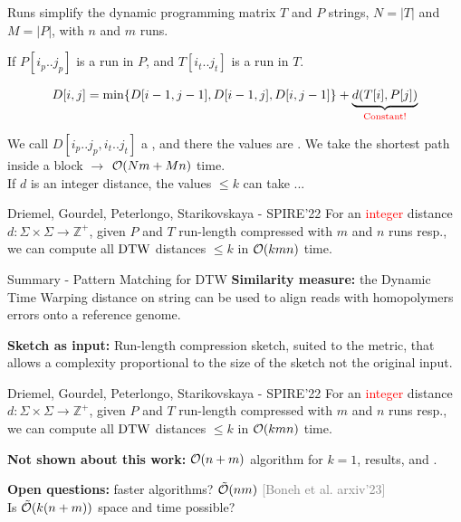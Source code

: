 \begin{frame}{Runs simplify the dynamic programming matrix}
    $T$ and $P$ strings, $N=|T|$ and $M=|P|$, with $n$ and $m$ runs. \pause
    \smallskip

    If $P[i_p.. j_p]$ is a run in $P$, and $T[i_t .. j_t]$ is a run in $T$.\pause
    
    
    {
    \[
        D[i,j] = {\min\{D[i-1,j-1],D[i-1,j],D[i,j-1]\}
        + \underbrace{d(T[i], P[j])}_\text{\textcolor{red}{Constant!}}}
    \]
    }

    \pause       
    We call $D[i_p .. j_p, i_t .. j_t]$ a , and there the values are . \pause
    We take the shortest path inside a block $\rightarrow$ $\mathcal{O}(Nm+Mn)$ time.\\ \pause
    If $d$ is an integer distance, the values $\leq k$ can take ... \pause
    
    \begin{myalertblock}{Driemel, Gourdel, Peterlongo, Starikovskaya - SPIRE'22}
        For an \textcolor{red}{integer} distance $d: \Sigma \times \Sigma \rightarrow \mathbb{Z}^+$, given $P$ and $T$ run-length compressed with $m$ and $n$ runs resp.,
        we can compute all $\mathrm{DTW}$ distances $\leq k$ in $\mathcal{O}(k mn)$ time.
    \end{myalertblock}
    \end{frame}

\begin{frame}{Summary - Pattern Matching for DTW}
    \textbf{Similarity measure:} the Dynamic Time Warping distance on string can be used to align reads with homopolymers errors onto a reference genome.

    \vfill
    
    \textbf{Sketch as input:} Run-length compression sketch, suited to the metric, that allows a complexity proportional to the size of the sketch not the original input.
    
    \vfill
    \begin{myalertblock}{Driemel, Gourdel, Peterlongo, Starikovskaya - SPIRE'22}
        For an \textcolor{red}{integer} distance $d: \Sigma \times \Sigma \rightarrow \mathbb{Z}^+$, given $P$ and $T$ run-length compressed with $m$ and $n$ runs resp.,
        we can compute all $\mathrm{DTW}$ distances $\leq k$ in $\mathcal{O}(k mn)$ time.
    \end{myalertblock}
    \vfill
    \textbf{Not shown about this work:} $\mathcal{O}(n+m)$ algorithm for $k=1$,  results, and .


    \smallskip
    \textbf{Open questions:} faster algorithms? \textcolor{gray}{ $\tilde{\mathcal{O}}(nm)$ [Boneh et al. arxiv'23]}\\ Is $\tilde{\mathcal{O}}(k(n+m))$ space and time possible?
\end{frame}
    